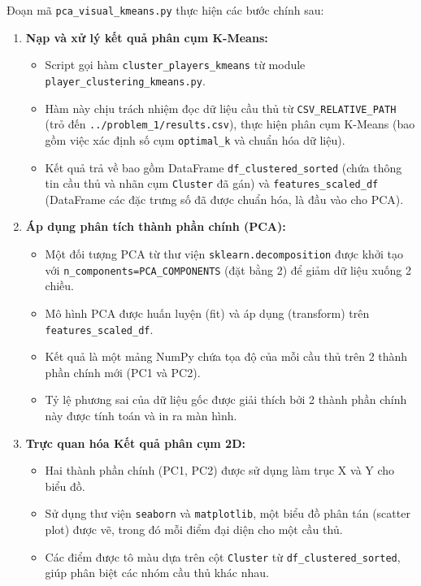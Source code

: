 \documentclass[12pt, a4paper]{report}
\begin{document}
Đoạn mã \texttt{pca\_visual\_kmeans.py} thực hiện các bước chính sau:
\begin{enumerate}[label=\textbf{Bước \arabic*:}, leftmargin=*]
    \item \textbf{Nạp và xử lý kết quả phân cụm K-Means:}
    \begin{itemize}
        \item Script gọi hàm \texttt{cluster\_players\_kmeans} từ module \texttt{player\_clustering\_kmeans.py}.
        \item Hàm này chịu trách nhiệm đọc dữ liệu cầu thủ từ \texttt{CSV\_RELATIVE\_PATH} (trỏ đến \texttt{../problem\_1/results.csv}), thực hiện phân cụm K-Means (bao gồm việc xác định số cụm \texttt{optimal\_k} và chuẩn hóa dữ liệu).
        \item Kết quả trả về bao gồm DataFrame \texttt{df\_clustered\_sorted} (chứa thông tin cầu thủ và nhãn cụm \texttt{Cluster} đã gán) và \texttt{features\_scaled\_df} (DataFrame các đặc trưng số đã được chuẩn hóa, là đầu vào cho PCA).
    \end{itemize}
    \item \textbf{Áp dụng phân tích thành phần chính (PCA):}
    \begin{itemize}
        \item Một đối tượng PCA từ thư viện \texttt{sklearn.decomposition} được khởi tạo với \texttt{n\_components=PCA\_COMPONENTS} (đặt bằng 2) để giảm dữ liệu xuống 2 chiều.
        \item Mô hình PCA được huấn luyện (fit) và áp dụng (transform) trên \texttt{features\_scaled\_df}.
        \item Kết quả là một mảng NumPy chứa tọa độ của mỗi cầu thủ trên 2 thành phần chính mới (PC1 và PC2).
        \item Tỷ lệ phương sai của dữ liệu gốc được giải thích bởi 2 thành phần chính này được tính toán và in ra màn hình.
    \end{itemize}
    \item \textbf{Trực quan hóa Kết quả phân cụm 2D:}
    \begin{itemize}
        \item Hai thành phần chính (PC1, PC2) được sử dụng làm trục X và Y cho biểu đồ.
        \item Sử dụng thư viện \texttt{seaborn} và \texttt{matplotlib}, một biểu đồ phân tán (scatter plot) được vẽ, trong đó mỗi điểm đại diện cho một cầu thủ.
        \item Các điểm được tô màu dựa trên cột \texttt{Cluster} từ \texttt{df\_clustered\_sorted}, giúp phân biệt các nhóm cầu thủ khác nhau.

\end{itemize}
\end{enumerate}
\end{document}
